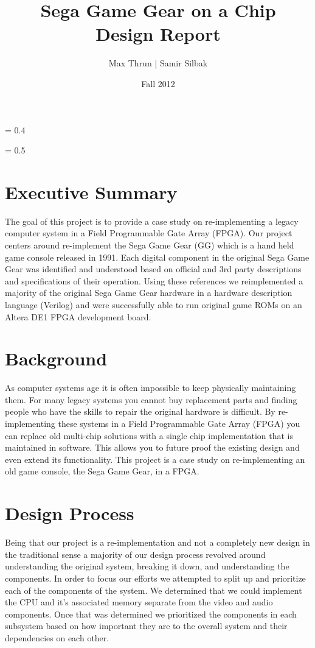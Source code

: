 \documentclass{article}
\title{
    \vspace{2in}
    \textbf{Sega Game Gear on a Chip}\\
    Design Report
    \vspace{3in}
}
\author{ Max Thrun | Samir Silbak}
\date{Fall 2012}
\begin{document}
\maketitle

\newpage
\parskip = 0.4\baselineskip
\tableofcontents

\parskip = 0.5\baselineskip

\newpage

\section{Executive Summary}

The goal of this project is to provide a case study on re-implementing a legacy
computer system in a Field Programmable Gate Array (FPGA). Our project centers
around re-implement the Sega Game Gear (GG) which is a hand held game console
released in 1991. Each digital component in the original Sega Game Gear was
identified and understood based on official and 3rd party descriptions and
specifications of their operation. Using these references we reimplemented a
majority of the original Sega Game Gear hardware in a hardware description
language (Verilog) and were successfully able to run original game ROMs on an
Altera DE1 FPGA development board.

\section{Background}

As computer systems age it is often impossible to keep physically maintaining
them.  For many legacy systems you cannot buy replacement parts and finding
people who have the skills to repair the original hardware is difficult. By
re-implementing these systems in a Field Programmable Gate Array (FPGA) you can
replace old multi-chip solutions with a single chip implementation that is
maintained in software. This allows you to future proof the existing design and
even extend its functionality. This project is a case study on re-implementing
an old game console, the Sega Game Gear, in a FPGA.

\section{Design Process}

Being that our project is a re-implementation and not a completely new design
in the traditional sense a majority of our design process revolved around
understanding the original system, breaking it down, and understanding the
components. In order to focus our efforts we attempted to split up and
prioritize each of the components of the system. We determined that we could
implement the CPU and it's associated memory separate from the video and audio
components. Once that was determined we prioritized the components in each
subsystem based on how important they are to the overall system and their
dependencies on each other.
\end{document}

